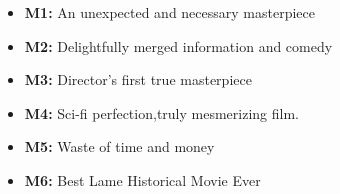\begin{frame}
	\begin{columns}
		\begin{overlayarea}{\textwidth}{\textheight}
		\tiny{\begin{block}{}
		\begin{itemize}\justifying
		\leftskip=-15pt
		\item \textbf{M1:} An unexpected and necessary masterpiece
		\item \textbf{M2:} Delightfully merged information and comedy
		\item \textbf{M3:} Director's first true masterpiece
		\item \textbf{M4:} Sci-fi perfection,truly mesmerizing film.
		\item \textbf{M5:} Waste of time and money
		\item \textbf{M6:} Best Lame Historical Movie Ever
		\end{itemize}
		\end{block}
		}

		\end{overlayarea}


\end{columns}
\end{frame}
